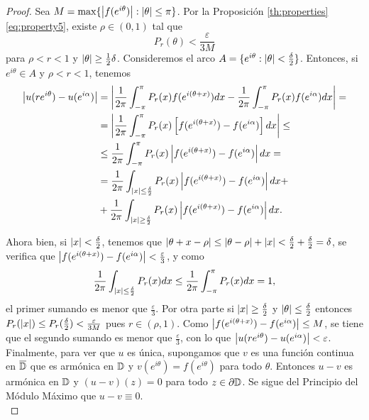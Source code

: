 \begin{proof}
    Sea $M = \max \{ \left\lvert f(e^{i \theta})\right\rvert : \left\lvert\theta\right\rvert \leq \pi \}$. Por la Proposición \ref{th:properties} \eqref{eq:property5}, existe $\rho \in (0,1)$ tal que
    \begin{equation*}
        P_r(\theta) < \frac{\varepsilon}{3 M}
    \end{equation*}
    para $\rho < r < 1$ y $\left\lvert\theta\right\rvert \geq \frac{1}{2} \delta$. Consideremos el arco $A = \{ e^{i \theta} : \left\lvert\theta\right\rvert < \frac{\delta}{2}\}$. Entonces, si $e^{i \theta} \in A$ y $\rho < r < 1$, tenemos
    \begin{equation*}
        \begin{split}
            \left\lvert u(re^{i \theta}) - u(e^{i \alpha})\right\rvert
            & = \left\lvert \dfrac{1}{2 \pi} \int_{- \pi}^{\pi} P_r (x) f(e^{i (\theta + x)}) dx -  \dfrac{1}{2 \pi} \int_{- \pi}^{\pi} P_r (x) f(e^{i \alpha}) dx \right\rvert = \\
            & = \left\lvert \dfrac{1}{2 \pi} \int_{- \pi}^{\pi} P_r (x) \left[f(e^{i (\theta + x)}) - f(e^{i \alpha}) \right] dx\right\rvert \leq \\
            & \leq \dfrac{1}{2 \pi} \int_{- \pi}^{\pi} P_r (x) \left\lvert f(e^{i (\theta + x)}) - f(e^{i \alpha})\right\rvert dx = \\
            & = \dfrac{1}{2 \pi} \int_{\left\lvert x\right\rvert \leq \frac{\delta}{2}} P_r (x) \left\lvert f(e^{i (\theta + x)}) - f(e^{i \alpha})\right\rvert dx + \\
            & + \dfrac{1}{2 \pi} \int_{\left\lvert x\right\rvert \geq \frac{\delta}{2}} P_r (x) \left\lvert f(e^{i (\theta + x)}) - f(e^{i \alpha})\right\rvert dx.
        \end{split}
    \end{equation*}

    Ahora bien, si $\left\lvert x\right\rvert < \frac{\delta}{2}$, tenemos que $\left\lvert\theta + x - \rho\right\rvert \leq \left\lvert\theta - \rho\right\rvert + \left\lvert x\right\rvert < \frac{\delta}{2} + \frac{\delta}{2} = \delta$, se verifica que $\left\lvert f(e^{i (\theta + x)}) - f(e^{i \alpha})\right\rvert < \frac{\varepsilon}{3}$, y como
    \begin{equation*}
        \dfrac{1}{2 \pi} \int_{\left\lvert x\right\rvert \leq \frac{\delta}{2}} P_r (x) dx \leq \dfrac{1}{2 \pi} \int_{-\pi}^{\pi} P_r (x) dx = 1,
    \end{equation*}
    el primer sumando es menor que $\frac{\varepsilon}{3}$. Por otra parte si $\left\lvert x\right\rvert \geq \frac{\delta}{2}$ y $\left\lvert\theta\right\rvert \leq \frac{\delta}{2}$ entonces $P_r(\left\lvert x\right\rvert) \leq P_r(\frac{\delta}{2}) < \frac{\varepsilon}{3M}$ pues $r \in (\rho, 1).$ Como $\left\lvert f(e^{i (\theta + x)}) - f(e^{i \alpha})\right\rvert \leq M$, se tiene que el segundo sumando es menor que $\frac{\varepsilon}{3}$, con lo que $\left\lvert u(re^{i \theta}) - u(e^{i \alpha})\right\rvert < \varepsilon$. \\

    Finalmente, para ver que $u$ es única, supongamos que $v$ es una función continua en $\overline{\mathbb{D}}$ que es armónica en $\mathbb{D}$ y $v(e^{i \theta}) = f(e^{i \theta})$ para todo $\theta$. Entonces $u - v$ es armónica en $\mathbb{D}$ y $(u - v)(z) = 0$ para todo $z \in \partial \mathbb{D}$. Se sigue del Principio del Módulo Máximo que $u - v \equiv 0$. \\
\end{proof}

